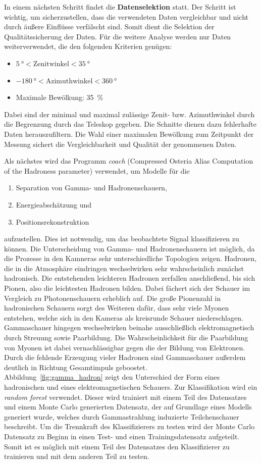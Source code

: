 In einem nächsten Schritt findet die \textbf{Datenselektion} statt. Der Schritt
ist wichtig, um sicherzustellen, dass die verwendeten Daten vergleichbar und
nicht durch äußere Einflüsse verfälscht sind. Somit dient die Selektion der
Qualitätssicherung der Daten. Für die weitere Analyse werden nur Daten
weiterverwendet, die den folgenden Kriterien genügen:
\begin{itemize}
  \item $\SI{5}{\degree}<\text{Zenitwinkel}<\SI{35}{\degree}$
  \item $\SI{-180}{\degree}<\text{Azimuthwinkel}<\SI{360}{\degree}$
  \item Maximale Bewölkung: \SI{35}{\percent}
\end{itemize}
Dabei sind der minimal und maximal zulässige Zenit- bzw. Azimuthwinkel durch die
Begrenzung durch das Teleskop gegeben. Die Schnitte dienen dazu fehlerhafte
Daten herauszufiltern. Die Wahl einer maximalen Bewölkung zum Zeitpunkt der
Messung sichert die Vergleichbarkeit und Qualität der genommenen Daten.

Als nächstes wird das Programm \textit{coach} (Compressed Osteria Alias
Computation of the Hadroness parameter) verwendet, um Modelle für die
\begin{enumerate}
  \item Separation von Gamma- und Hadronenschauern,
  \item Energieabschätzung und
  \item Positionsrekonstruktion
\end{enumerate}
aufzustellen. Dies ist notwendig, um das beobachtete Signal klassifizieren zu
können. Die Unterscheidung von Gamma- und Hadronenschauern ist möglich, da die
Prozesse in den Kamneras sehr unterschiedliche Topologien zeigen. Hadronen, die
in die Atmosphäre eindringen wechselwirken sehr wahrscheinlich zunächst hadronisch.
Die entstehenden leichteren Hadronen zerfallen anschließend, bis sich Pionen, also
die leichtesten Hadronen bilden. Dabei fächert sich der Schauer im Vergleich zu
Photonenschauern erheblich auf. Die große Pionenzahl in hadronischen Schauern sorgt
des Weiteren dafür, dass sehr viele Myonen entstehen, welche sich in den Kameras als
kreisrunde Schauer niederschlagen.
Gammaschauer hingegen wechselwirken beinahe ausschließlich elektromagnetisch durch
Streuung sowie Paarbildung. Die Wahrscheinlichkeit für die Paarbildung von Myonen
ist dabei vernachlässigbar gegen die der Bildung von Elektronen. Durch die fehlende
Erzeugung vieler Hadronen sind Gammaschauer außerdem deutlich in Richtung Gesamtimpuls
geboostet. \\
Abbildung~\ref{fig:gamma_hadron} zeigt den Unterschied der Form eines
hadronischen und eines elektromagnetischen Schauers. Zur Klassifikation wird ein
\textit{random forest} verwendet. Dieser wird trainiert mit einem Teil des
Datensatzes und einem Monte Carlo generierten Datensatz, der auf Grundlage eines
Modells generiert wurde, welches durch Gammastrahlung induzierte Teilchenschauer
beschreibt. Um die Trennkraft des Klassifizierers zu testen wird der Monte
Carlo Datensatz zu Beginn in einen Test- und einen Trainingsdatensatz
aufgeteilt. Somit ist es möglich mit einem Teil des Datensatzes den
Klassifizierer zu trainieren und mit dem anderen Teil zu testen.

